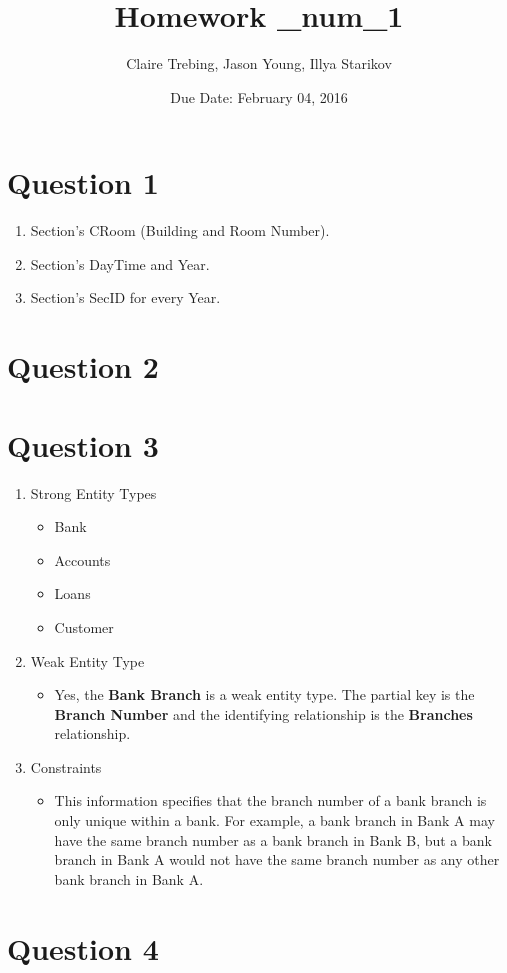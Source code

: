 \documentclass{article}
\begin{document}
\title{Homework \_num_1}
\author{Claire Trebing, Jason Young, Illya Starikov}
\date{Due Date: February 04, 2016}

\maketitle

\section*{Question 1}
\begin{enumerate}[label=\alph*]
\item Section's CRoom (Building and Room Number).
\item Section's DayTime and Year.
\item Section's SecID for every Year.
\end{enumerate}

\section*{Question 2}
\begin{center}

\end{center}


\section*{Question 3}
\begin{enumerate}[label=\alph*]
\item Strong Entity Types
    \begin{itemize}
    \item Bank
    \item Accounts
    \item Loans
    \item Customer
    \end{itemize}
\item Weak Entity Type
    \begin{itemize}
    \item Yes, the \textbf{Bank Branch} is a weak entity type. The partial key is the \textbf{Branch Number} and the identifying relationship is the \textbf{Branches} relationship.
    \end{itemize}
\item Constraints
    \begin{itemize}
    \item This information specifies that the branch number of a bank branch is only unique within a bank. For example, a bank branch in Bank A may have the same branch number as a bank branch in Bank B, but a bank branch in Bank A would not have the same branch number as any other bank branch in Bank A.
    \end{itemize}
\end{enumerate}

\section*{Question 4}

\end{document}
